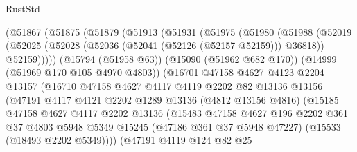 \begin{lexlean}{RustStd}
\begin{coremodule}
                  (@51867
                    (@51875
                      (@51879
                        (@51913
                          (@51931
                            (@51975
                              (@51980
                                (@51988
                                  (@52019
                                    (@52025
                                      (@52028 (@52036 (@52041 (@52126 (@52157 @52159))) @36818))
                                      @52159)))))
                            (@15794 (@51958 @63))
                            (@15090 (@51962 @682 @170))
                            (@14999 (@51969 @170 @105 @4970 @4803))
                            (@16701
                              @47158
                              @4627
                              @4123
                              @2204
                              @13157
                              (@16710
                                @47158
                                @4627
                                @4117
                                @4119
                                @2202
                                @82
                                @13136
                                @13156
                                (@47191
                                  @4117
                                  @4121
                                  @2202
                                  @1289
                                  @13136
                                  (@4812 @13156 @4816)
                                  (@15185
                                    @47158
                                    @4627
                                    @4117
                                    @2202
                                    @13136
                                    (@15483
                                      @47158
                                      @4627
                                      @196
                                      @2202
                                      @361
                                      @37
                                      @4803
                                      @5948
                                      @5349
                                      @15245
                                      (@47186 @361 @37 @5948 @47227)
                                      (@15533 (@18493 @2202 @5349))))
                                  (@47191
                                    @4119
                                    @124
                                    @82
                                    @25

\end{coremodule}
\end{lexlean}

